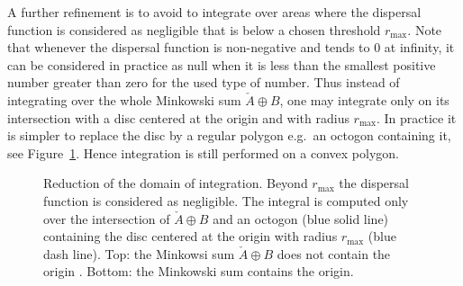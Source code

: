 A further refinement is to avoid to integrate over areas where the
dispersal function is considered as negligible that is below a chosen
threshold $r_\text{max}$. Note that whenever the dispersal function
is non-negative and tends to $0$ at infinity, it can be considered in
practice as null when it is less than the smallest positive number
greater than zero for the used type of number. Thus instead of
integrating over the whole Minkowski sum $\check{A}\oplus B$, one may
integrate only on its intersection with a disc centered at the origin
and with radius $r_\text{max}$. In practice it is simpler to replace
the disc by a regular polygon e.g.\ an octogon containing it, see
Figure~\ref{fig:reduc:minkowski}. Hence integration is still performed
on a convex polygon.
\begin{figure}[htbp]
  \centering
  
  \caption{Reduction of the domain of integration. Beyond
    $r_\text{max}$ the dispersal function is considered as
    negligible. The integral is computed only over the intersection of
    $\check{A}\oplus B$ and an octogon (blue solid line) containing
    the disc centered at the origin with radius $r_\text{max}$ (blue
    dash line). Top: the Minkowsi sum $\check{A}\oplus B$ does not
    contain the origin
. Bottom: the Minkowski sum contains the origin.}
  \label{fig:reduc:minkowski}
\end{figure}





